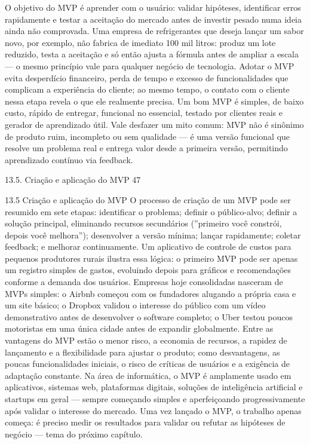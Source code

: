 O objetivo do MVP é aprender com o usuário: validar hipóteses, identificar erros rapidamente e testar a aceitação do mercado antes de investir pesado numa ideia ainda não comprovada. Uma empresa de refrigerantes que deseja lançar um sabor novo, por exemplo, não fabrica de imediato 100 mil litros: produz um lote reduzido, testa a aceitação e só então ajusta a fórmula antes de ampliar a escala — o mesmo princípio vale para qualquer negócio de tecnologia. Adotar o MVP evita desperdício financeiro, perda de tempo e excesso de funcionalidades que complicam a experiência do cliente; ao mesmo tempo, o contato com o cliente nessa etapa revela o que ele realmente precisa. Um bom MVP é simples, de baixo custo, rápido de entregar, funcional no essencial, testado por clientes reais e gerador de aprendizado útil. Vale desfazer um mito comum: MVP não é sinônimo de produto ruim, incompleto ou sem qualidade — é uma versão funcional que resolve um problema real e entrega valor desde a primeira versão, permitindo aprendizado contínuo via feedback.

13.5. Criação e aplicação do MVP 47

13.5 Criação e aplicação do MVP O processo de criação de um MVP pode ser resumido em sete etapas: identificar o problema; definir o público-alvo; definir a solução principal, eliminando recursos secundários (”primeiro você constrói, depois você melhora”); desenvolver a versão mínima; lançar rapidamente; coletar feedback; e melhorar continuamente. Um aplicativo de controle de custos para pequenos produtores rurais ilustra essa lógica: o primeiro MVP pode ser apenas um registro simples de gastos, evoluindo depois para gráficos e recomendações conforme a demanda dos usuários. Empresas hoje consolidadas nasceram de MVPs simples: o Airbnb começou com os fundadores alugando a própria casa e um site básico; o Dropbox validou o interesse do público com um vídeo demonstrativo antes de desenvolver o software completo; o Uber testou poucos motoristas em uma única cidade antes de expandir globalmente. Entre as vantagens do MVP estão o menor risco, a economia de recursos, a rapidez de lançamento e a flexibilidade para ajustar o produto; como desvantagens, as poucas funcionalidades iniciais, o risco de críticas de usuários e a exigência de adaptação constante. Na área de informática, o MVP é amplamente usado em aplicativos, sistemas web, plataformas digitais, soluções de inteligência artificial e startups em geral — sempre começando simples e aperfeiçoando progressivamente após validar o interesse do mercado. Uma vez lançado o MVP, o trabalho apenas começa: é preciso medir os resultados para validar ou refutar as hipóteses de negócio — tema do próximo capítulo.

